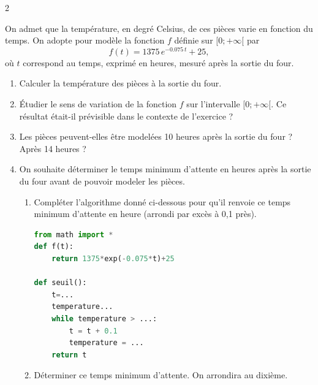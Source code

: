 \documentclass[a4paper,12pt]{article}
\begin{document}
\begin{multicols}{2}
\begin{exercice}[title=Exercice 11 $\star\star$ { [Modéliser, Calculer, Représenter] }]{}{}
    On admet que la température, en degré Celsius, de ces pièces varie en fonction du temps. On adopte pour modèle la fonction $f$ définie sur $[0;+\infty[$ par 
    \[
    f(t)=1375\,e^{-0.075\,t}+25,
    \]
    où $t$ correspond au temps, exprimé en heures, mesuré après la sortie du four.
    \begin{enumerate}
      \item Calculer la température des pièces à la sortie du four.
      \item Étudier le sens de variation de la fonction $f$ sur l’intervalle $[0;+\infty[$. Ce résultat était-il prévisible dans le contexte de l’exercice ?
      \item Les pièces peuvent-elles être modelées 10 heures après la sortie du four ? Après 14 heures ?
      \item On souhaite déterminer le temps minimum d’attente en heures après la sortie du four avant de pouvoir modeler les pièces.
      \begin{enumerate}
        \item Compléter l’algorithme donné ci-dessous pour qu’il renvoie ce temps minimum d’attente en heure (arrondi par excès à 0,1 près).
    \begin{lstlisting}[language=Python]
from math import *
def f(t):
    return 1375*exp(-0.075*t)+25

def seuil():
    t=...
    temperature...
    while temperature > ...:
        t = t + 0.1
        temperature = ...
    return t
    \end{lstlisting}
        \item Déterminer ce temps minimum d’attente. On arrondira au dixième.
      \end{enumerate}
    \end{enumerate}
    \end{exercice}    
    

\end{multicols}
\end{document}

